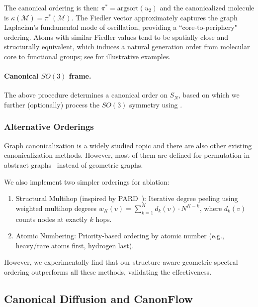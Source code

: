 \documentclass{article}
\theoremstyle{plain}
\theoremstyle{definition}
\theoremstyle{remark}
\newcommand{\1}{\mathbf{1}}
\begin{document}
The canonical ordering is then: $\pi^* = \text{argsort}(u_2)$
and the canonicalized molecule is $\kappa(\mathcal{M}) = \pi^*(\mathcal{M})$.
The Fiedler vector approximately captures the graph Laplacian's fundamental mode of oscillation, providing a ``core-to-periphery" ordering. Atoms with similar Fiedler values tend to be spatially close and structurally equivalent, which induces a natural generation order from molecular core to functional groups; see  for illustrative examples.


\paragraph{Canonical $SO(3)$ frame.} The above procedure determines a canonical order on $S_N$, based on which we further (optionally) process the $SO(3)$ symmetry using .


\subsubsection{Alternative Orderings} 
Graph canonicalization is a widely studied topic and there are also other existing canonicalization methods. However, most of them are defined for permutation in abstract graphs~\citep{zhao2024pard,LaplacianCanonization,RethinkingGraphCanon} instead of geometric graphs.

We also implement two simpler orderings for ablation:
\begin{enumerate}
    \item Structural Multihop (inspired by PARD~\citep{zhao2024pard}): Iterative degree peeling using weighted multihop degrees $w_{K}(v) = \sum_{k=1}^{K} d_k(v) \cdot N^{K-k}$, where $d_k(v)$ counts nodes at exactly $k$ hops.
    \item Atomic Numbering: Priority-based ordering by atomic number (e.g., heavy/rare atoms first, hydrogen last).
\end{enumerate}

However, we experimentally find that our structure-aware geometric spectral ordering outperforms all these methods, validating the effectiveness.



\subsection{Canonical Diffusion and CanonFlow}\label{subsec_appendix:arch} 
\end{document}
